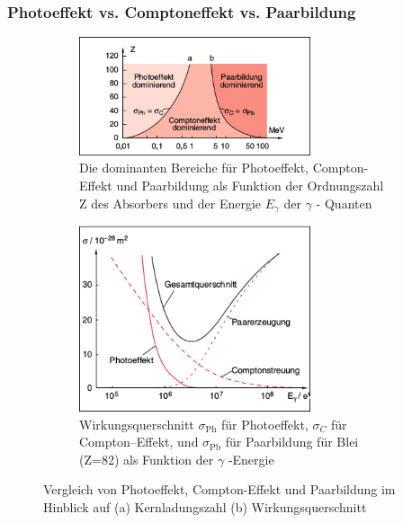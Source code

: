 \documentclass[Ex4_Zusammenfassung.tex]{subfiles}
\begin{document}
\subsubsection{Photoeffekt vs. Comptoneffekt vs. Paarbildung}
\clearpage
\begin{figure}[h]
	\begin{subfigure}{\textwidth}
		\centering
		\includegraphics[width=6.8cm]{FCP_Z.png}
		\caption{Die dominanten Bereiche für Photoeffekt, Compton-Effekt und Paarbildung als Funktion der Ordnungszahl Z des Absorbers und der Energie $ E_{\gamma} $ der $ \gamma $ - Quanten}
	\end{subfigure}
	\begin{subfigure}{\textwidth}
		\centering
		\includegraphics[width=6.8cm]{FCP_sigma.png}
		\caption{Wirkungsquerschnitt $ \sigma_{\text{Ph}} $ für Photoeffekt, $ \sigma_{C} $ für Compton--Effekt, und $ \sigma_{\text{Pb}} $ für Paarbildung für Blei (Z=82) als Funktion der $ \gamma $ -Energie}
	\end{subfigure}
	\caption{Vergleich von Photoeffekt, Compton-Effekt und Paarbildung im Hinblick auf (a) Kernladungszahl (b) Wirkungsquerschnitt}
\end{figure}
\clearpage
\thispagestyle{empty}
\end{document}
